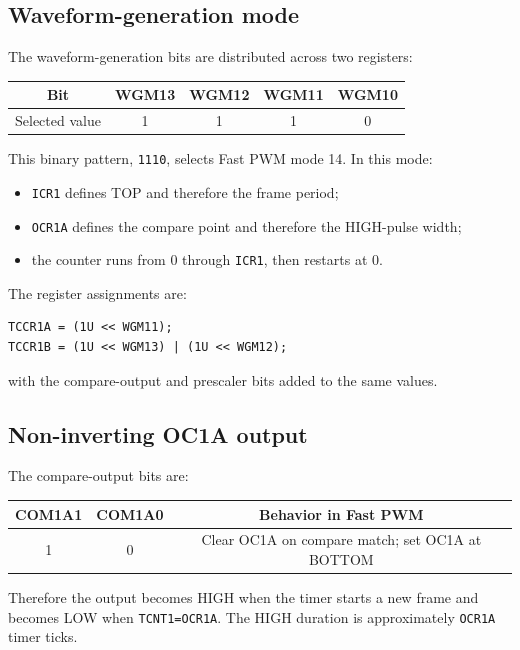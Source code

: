 \documentclass[11pt,a4paper]{article}
\begin{document}
\subsection{Waveform-generation mode}
The waveform-generation bits are distributed across two registers:
\begin{center}
\begin{tabular}{ccccc}
\toprule
Bit & WGM13 & WGM12 & WGM11 & WGM10 \\
\midrule
Selected value & 1 & 1 & 1 & 0 \\
\bottomrule
\end{tabular}
\end{center}
This binary pattern, \texttt{1110}, selects Fast PWM mode 14. In this mode:
\begin{itemize}
  \item \texttt{ICR1} defines TOP and therefore the frame period;
  \item \texttt{OCR1A} defines the compare point and therefore the HIGH-pulse width;
  \item the counter runs from 0 through \texttt{ICR1}, then restarts at 0.
\end{itemize}

The register assignments are:
\begin{lstlisting}[style=cstyle]
TCCR1A = (1U << WGM11);
TCCR1B = (1U << WGM13) | (1U << WGM12);
\end{lstlisting}
with the compare-output and prescaler bits added to the same values.

\subsection{Non-inverting OC1A output}
The compare-output bits are:
\begin{center}
\begin{tabular}{ccc}
\toprule
COM1A1 & COM1A0 & Behavior in Fast PWM \\
\midrule
1 & 0 & Clear OC1A on compare match; set OC1A at BOTTOM \\
\bottomrule
\end{tabular}
\end{center}
Therefore the output becomes HIGH when the timer starts a new frame and becomes LOW when \texttt{TCNT1=OCR1A}. The HIGH duration is approximately \texttt{OCR1A} timer ticks.
\end{document}
